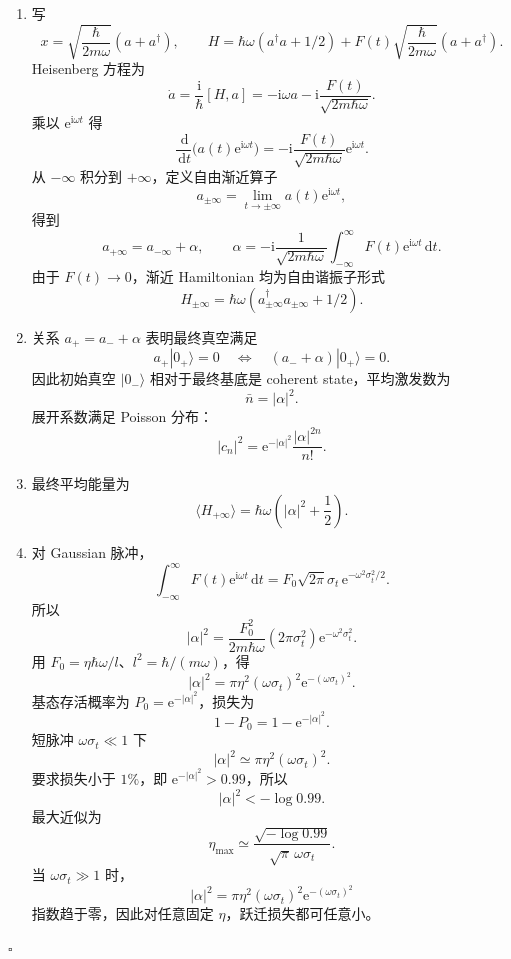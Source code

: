 \documentclass[UTF8,12pt]{ctexart}
\newcommand{\dd}{\,\mathrm d}
\newcommand{\ii}{\mathrm i}
\newcommand{\ee}{\mathrm e}
\newenvironment{solution}{%
  \par\medskip
  \noindent{\bfseries 解答}\quad\ignorespaces
}{\hfill$\square$\par\medskip}
\begin{document}
\begin{solution}
\begin{enumerate}[label=(\alph*)]
\item 写
\[
x=\sqrt{\frac{\hbar}{2m\omega}}(a+a^\dagger),\qquad
H=\hbar\omega(a^\dagger a+1/2)+F(t)\sqrt{\frac{\hbar}{2m\omega}}(a+a^\dagger).
\]
Heisenberg 方程为
\[
\dot a=\frac{\ii}{\hbar}[H,a]
=-\ii\omega a-\ii\frac{F(t)}{\sqrt{2m\hbar\omega}}.
\]
乘以 \(\ee^{\ii\omega t}\) 得
\[
\frac{\dd}{\dd t}\bigl(a(t)\ee^{\ii\omega t}\bigr)
=-\ii\frac{F(t)}{\sqrt{2m\hbar\omega}}\ee^{\ii\omega t}.
\]
从 \(-\infty\) 积分到 \(+\infty\)，定义自由渐近算子
\[
a_{\pm\infty}=\lim_{t\to\pm\infty}a(t)\ee^{\ii\omega t},
\]
得到
\[
a_{+\infty}=a_{-\infty}+\alpha,
\qquad
\alpha=-\ii\frac1{\sqrt{2m\hbar\omega}}
\int_{-\infty}^{\infty}F(t)\ee^{\ii\omega t}\dd t.
\]
由于 \(F(t)\to0\)，渐近 Hamiltonian 均为自由谐振子形式
\[
H_{\pm\infty}=\hbar\omega(a_{\pm\infty}^\dagger a_{\pm\infty}+1/2).
\]

\item 关系 \(a_+=a_-+\alpha\) 表明最终真空满足
\[
a_+|0_+\rangle=0
\quad\Longleftrightarrow\quad
(a_-+\alpha)|0_+\rangle=0.
\]
因此初始真空 \(|0_-\rangle\) 相对于最终基底是 coherent state，平均激发数为
\[
\bar n=|\alpha|^2.
\]
展开系数满足 Poisson 分布：
\[
|c_n|^2=\ee^{-|\alpha|^2}\frac{|\alpha|^{2n}}{n!}.
\]

\item 最终平均能量为
\[
\langle H_{+\infty}\rangle
=\hbar\omega\left(|\alpha|^2+\frac12\right).
\]

\item 对 Gaussian 脉冲，
\[
\int_{-\infty}^{\infty}F(t)\ee^{\ii\omega t}\dd t
=F_0\sqrt{2\pi}\sigma_t\,\ee^{-\omega^2\sigma_t^2/2}.
\]
所以
\[
|\alpha|^2
=\frac{F_0^2}{2m\hbar\omega}(2\pi\sigma_t^2)\ee^{-\omega^2\sigma_t^2}.
\]
用 \(F_0=\eta\hbar\omega/l\)、\(l^2=\hbar/(m\omega)\)，得
\[
|\alpha|^2=\pi\eta^2(\omega\sigma_t)^2\ee^{-(\omega\sigma_t)^2}.
\]
基态存活概率为 \(P_0=\ee^{-|\alpha|^2}\)，损失为
\[
1-P_0=1-\ee^{-|\alpha|^2}.
\]
短脉冲 \(\omega\sigma_t\ll1\) 下
\[
|\alpha|^2\simeq \pi\eta^2(\omega\sigma_t)^2.
\]
要求损失小于 \(1\%\)，即 \(\ee^{-|\alpha|^2}>0.99\)，所以
\[
|\alpha|^2<-\log0.99.
\]
最大近似为
\[
\eta_{\max}
\simeq \frac{\sqrt{-\log0.99}}{\sqrt\pi\,\omega\sigma_t}.
\]
当 \(\omega\sigma_t\gg1\) 时，
\[
|\alpha|^2=\pi\eta^2(\omega\sigma_t)^2\ee^{-(\omega\sigma_t)^2}
\]
指数趋于零，因此对任意固定 \(\eta\)，跃迁损失都可任意小。
\end{enumerate}
\end{solution}
\end{document}
